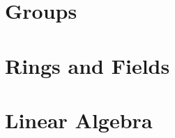 \documentclass{article}
\theoremstyle{definition}
\begin{document}
	

\section{Groups}

	

	

	

	

	

	

	

\section{Rings and Fields}
	

	

	

	

	

	

\section{Linear Algebra}
	

	

	
	
	

	


\end{document}
